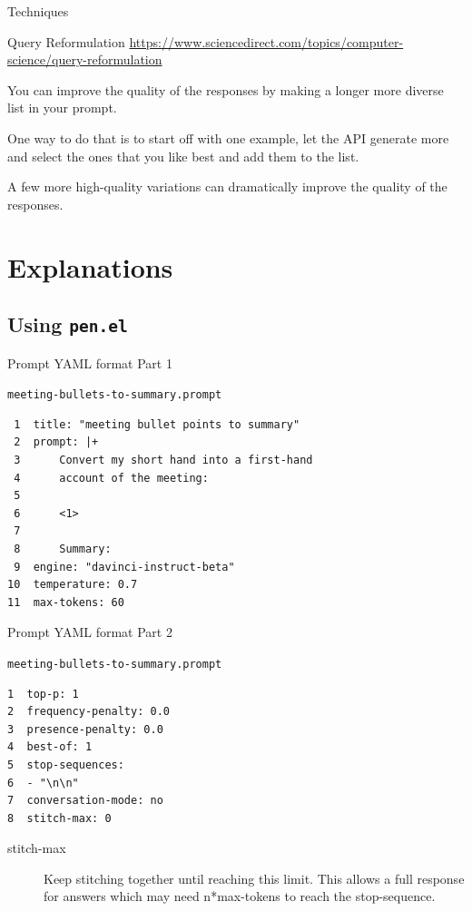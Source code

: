\documentclass[presentation]{beamer}
\begin{document}
\begin{frame}[label={sec:orge164753}]{Techniques}
\begin{block}{Query Reformulation}
\url{https://www.sciencedirect.com/topics/computer-science/query-reformulation}

You can improve the quality of the responses
by making a longer more diverse list in your
prompt.

One way to do that is to start off with one
example, let the API generate more and select
the ones that you like best and add them to
the list.

A few more high-quality variations can
dramatically improve the quality of the
responses.
\end{block}
\end{frame}

\section{Explanations}
\label{sec:org9e22c48}
\subsection{Using \texttt{pen.el}}
\label{sec:org19cb546}
\begin{frame}[label={sec:org5d74e51},fragile]{Prompt YAML format Part 1}
 \begin{block}{\texttt{meeting-bullets-to-summary.prompt}}
\begin{verbatim}
 1  title: "meeting bullet points to summary"
 2  prompt: |+
 3      Convert my short hand into a first-hand
 4      account of the meeting:
 5  
 6      <1>
 7  
 8      Summary:
 9  engine: "davinci-instruct-beta"
10  temperature: 0.7
11  max-tokens: 60
\end{verbatim}
\end{block}
\end{frame}

\begin{frame}[label={sec:org7e1e4bb},fragile]{Prompt YAML format Part 2}
 \begin{block}{\texttt{meeting-bullets-to-summary.prompt}}
\begin{verbatim}
1  top-p: 1
2  frequency-penalty: 0.0
3  presence-penalty: 0.0
4  best-of: 1
5  stop-sequences:
6  - "\n\n"
7  conversation-mode: no
8  stitch-max: 0
\end{verbatim}

\begin{description}
\item[{stitch-max}] Keep stitching together until reaching this limit.
This allows a full response for answers which may need n*max-tokens to reach the stop-sequence.
\end{description}
\end{block}
\end{frame}
\end{document}
